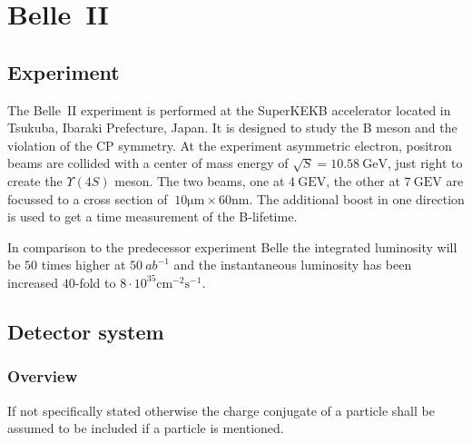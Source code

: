\chapter{Belle~\RN{2}}
\label{chap:belle2_experiment}

\section{Experiment}
\label{sec:experimental}

The Belle~\RN{2} experiment is performed at the SuperKEKB accelerator located in Tsukuba, Ibaraki Prefecture, Japan. It is designed to study the B meson and the violation of the CP symmetry.
At the experiment asymmetric electron, positron beams are collided with a center of mass energy of $\sqrt{S} = 10.58 \mathrm{~GeV}$, just right to create the $\Upsilon (4S)$ meson. The two beams, one at $4 \mathrm{~GEV}$, the other at $7 \mathrm{~GEV}$ are focussed to a cross section of $~10 \mathrm{\mu m} \times 60 \mathrm{nm}$. The additional boost in one direction is used to get a time measurement of the B-lifetime.

In comparison to the predecessor experiment Belle the integrated luminosity will be $50$ times higher at $50~{ab}^{-1}$ and the instantaneous luminosity has been increased $40$-fold to $8 \cdot 10^{35} \mathrm{cm}^{-2} \mathrm{s}^{-1}$.

\section{Detector system}
\label{sec:detector_system}

\subsection{Overview}
\label{subsec:detector_system_overview}

If not specifically stated otherwise the charge conjugate of a particle shall be assumed to be included if a particle is mentioned.

